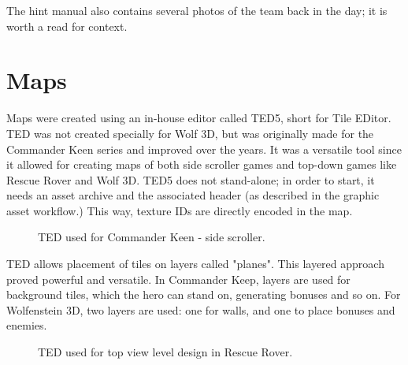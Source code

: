 \documentclass[book.tex]{subfiles}
\begin{document}
     \begin{figure}[H]
\centering
   \end{figure}


\par 
The hint manual also contains several photos of the team back in the day; it is worth a read for context.













\section{Maps}
Maps were created using an in-house editor called TED5, short for Tile EDitor. TED was not created specially for Wolf 3D, but was originally made for the Commander Keen series and improved over the years. It was a versatile tool since it allowed for creating maps of both side scroller games and top-down games like Rescue Rover and Wolf 3D. TED5 does not stand-alone; in order to start, it needs an asset archive and the  associated header (as described in the graphic asset workflow.) This way, texture IDs are directly encoded in the map.\\

 \begin{figure}[H]
\centering
 \end{figure}

  \begin{figure}[H]
\centering

 \end{figure}


 \begin{figure}[H]
\centering
 \caption{TED used for Commander Keen - side scroller.} 
 \end{figure}

TED allows placement of tiles on layers called "planes". This layered approach proved powerful and versatile. In Commander Keep, layers are used for background tiles, which the hero can stand on, generating bonuses and so on. For Wolfenstein 3D, two layers are used: one for walls, and one to place bonuses and enemies.\\
\begin{figure}[H]
\centering
 \caption{TED used for top view level design in Rescue Rover.} 
 \end{figure}
\end{document}
